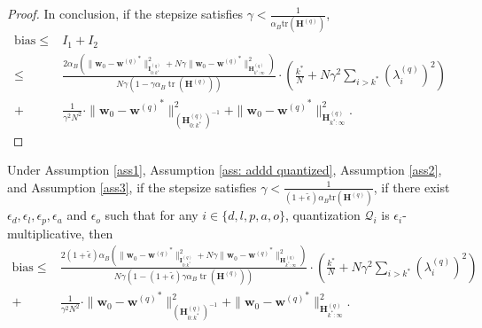 \documentclass[11pt, letterpaper]{article}
\begin{document}
\begin{proof}
    In conclusion, if the stepsize satisfies $\gamma < \frac{1}{\alpha_B\mathrm{tr}(\mathbf{H}^{(q)})}$,
    \begin{equation*}
        \begin{aligned}
            \mathrm{bias}\leq& I_1+I_2\\
            \leq & \frac{2\alpha_B\left(\|\mathbf{w}_0-{\mathbf{w}^{(q)}}^*\|_{\mathbf{I}_{0:k^*}^{(q)}}^2+N\gamma\|\mathbf{w}_0-{\mathbf{w}^{(q)}}^*\|_{\mathbf{H}_{k^*:\infty}^{(q)}}^2\right)}{N\gamma(1-\gamma\alpha_B\operatorname{tr}(\mathbf{H}^{(q)}))}\cdot\left(\frac{k^*}{N}+N\gamma^2\sum_{i>k^*}(\lambda_i^{(q)})^2\right)\\
            +& \frac{1}{\gamma^2N^2}\cdot\|\mathbf{w}_0-{\mathbf{w}^{(q)}}^*\|_{(\mathbf{H}_{0:k^*}^{(q)})^{-1}}^2+\|\mathbf{w}_0-{\mathbf{w}^{(q)}}^*\|_{\mathbf{H}_{k^*:\infty}^{(q)}}^2.
        \end{aligned}
    \end{equation*}
\end{proof}

\begin{lemma}
    \label{bias R2 bound multiplicative}
    Under Assumption \ref{ass1}, Assumption \ref{ass: addd quantized}, Assumption \ref{ass2}, and Assumption \ref{ass3}, if the stepsize satisfies $\gamma < \frac{1}{(1+\tilde{\epsilon})\alpha_B\mathrm{tr}(\mathbf{H}^{(q)})}$, if there exist $\epsilon_d,\epsilon_l,\epsilon_p,\epsilon_a$ and $\epsilon_o$ such that for any $i\in \{d,l,p,a,o\}$, quantization $\mathcal{Q}_i$ is $\epsilon_i$-multiplicative, then
    \begin{equation*}
        \begin{aligned}
            \mathrm{bias}\leq & \frac{2(1+\tilde{\epsilon})\alpha_B\left(\|\mathbf{w}_0-{\mathbf{w}^{(q)}}^*\|_{\mathbf{I}_{0:k^*}^{(q)}}^2+N\gamma\|\mathbf{w}_0-{\mathbf{w}^{(q)}}^*\|_{\mathbf{H}_{k^*:\infty}^{(q)}}^2\right)}{N\gamma(1-(1+\tilde{\epsilon})\gamma\alpha_B\operatorname{tr}(\mathbf{H}^{(q)}))}\cdot\left(\frac{k^*}{N}+N\gamma^2\sum_{i>k^*}(\lambda_i^{(q)})^2\right)\\
            +& \frac{1}{\gamma^2N^2}\cdot\|\mathbf{w}_0-{\mathbf{w}^{(q)}}^*\|_{(\mathbf{H}_{0:k^*}^{(q)})^{-1}}^2+\|\mathbf{w}_0-{\mathbf{w}^{(q)}}^*\|_{\mathbf{H}_{k^*:\infty}^{(q)}}^2.
        \end{aligned}
    \end{equation*}
\end{lemma}
\end{document}
